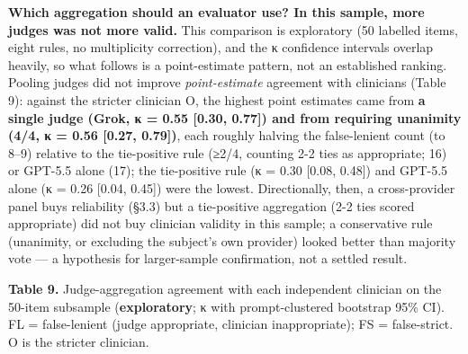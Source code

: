 \documentclass[
  11pt,
]{article}
\begin{document}
\textbf{Which aggregation should an evaluator use? In this sample, more
judges was not more valid.} This comparison is exploratory (50 labelled
items, eight rules, no multiplicity correction), and the κ confidence
intervals overlap heavily, so what follows is a point-estimate pattern,
not an established ranking. Pooling judges did not improve
\emph{point-estimate} agreement with clinicians (Table 9): against the
stricter clinician O, the highest point estimates came from \textbf{a
single judge (Grok, κ = 0.55 {[}0.30, 0.77{]}) and from requiring
unanimity (4/4, κ = 0.56 {[}0.27, 0.79{]})}, each roughly halving the
false-lenient count (to 8--9) relative to the tie-positive rule (≥2/4,
counting 2-2 ties as appropriate; 16) or GPT-5.5 alone (17); the
tie-positive rule (κ = 0.30 {[}0.08, 0.48{]}) and GPT-5.5 alone (κ =
0.26 {[}0.04, 0.45{]}) were the lowest. Directionally, then, a
cross-provider panel buys reliability (§3.3) but a tie-positive
aggregation (2-2 ties scored appropriate) did not buy clinician validity
in this sample; a conservative rule (unanimity, or excluding the
subject's own provider) looked better than majority vote --- a
hypothesis for larger-sample confirmation, not a settled result.

\textbf{Table 9.} Judge-aggregation agreement with each independent
clinician on the 50-item subsample (\textbf{exploratory}; κ with
prompt-clustered bootstrap 95\% CI). FL = false-lenient (judge
appropriate, clinician inappropriate); FS = false-strict. O is the
stricter clinician.
\end{document}
